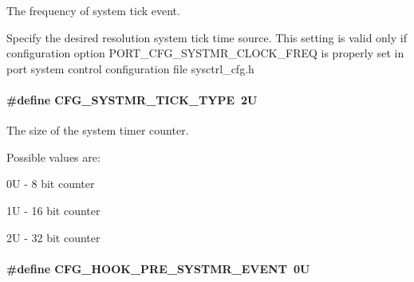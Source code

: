 The frequency of system tick event. 

Specify the desired resolution system tick time source. This setting is valid only if configuration option {\ttfamily P\-O\-R\-T\-\_\-\-C\-F\-G\-\_\-\-S\-Y\-S\-T\-M\-R\-\_\-\-C\-L\-O\-C\-K\-\_\-\-F\-R\-E\-Q} is properly set in port system control configuration file sysctrl\-\_\-cfg.\-h \hypertarget{group__template__kern__cfg_gad69eef523459c5ab485ce2f62bddceca}{
\paragraph[{C\-F\-G\-\_\-\-S\-Y\-S\-T\-M\-R\-\_\-\-T\-I\-C\-K\-\_\-\-T\-Y\-P\-E}]{\setlength{\rightskip}{0pt plus 5cm}\#define C\-F\-G\-\_\-\-S\-Y\-S\-T\-M\-R\-\_\-\-T\-I\-C\-K\-\_\-\-T\-Y\-P\-E~2\-U}}\label{group__template__kern__cfg_gad69eef523459c5ab485ce2f62bddceca}


The size of the system timer counter. 

Possible values are\-:
\begin{DoxyItemize}
\item 0\-U -\/ 8 bit counter
\item 1\-U -\/ 16 bit counter
\item 2\-U -\/ 32 bit counter 
\end{DoxyItemize}\hypertarget{group__template__kern__cfg_gaa130bc9f72010b44b4b06618d8f8d0bc}{
\paragraph[{C\-F\-G\-\_\-\-H\-O\-O\-K\-\_\-\-P\-R\-E\-\_\-\-S\-Y\-S\-T\-M\-R\-\_\-\-E\-V\-E\-N\-T}]{\setlength{\rightskip}{0pt plus 5cm}\#define C\-F\-G\-\_\-\-H\-O\-O\-K\-\_\-\-P\-R\-E\-\_\-\-S\-Y\-S\-T\-M\-R\-\_\-\-E\-V\-E\-N\-T~0\-U}}\label{group__template__kern__cfg_gaa130bc9f72010b44b4b06618d8f8d0bc}


